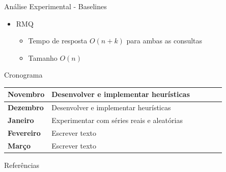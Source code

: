 \documentclass{beamer}
\begin{document}
\begin{frame}{Análise Experimental - Baselines}

\begin{itemize}
\item RMQ
\begin{itemize}
\item Tempo de resposta $O(n + k)$ para ambas as consultas
\item Tamanho $O(n)$
\end{itemize}
\end{itemize}

\end{frame}

\begin{frame}{Cronograma}
\begin{center}
\begin{tabular}{|l|l|l|l|l|l|}
\hline
\textbf{Novembro} & Desenvolver e implementar heurísticas \\
\hline
\textbf{Dezembro} & Desenvolver e implementar heurísticas \\
\hline
\textbf{Janeiro} & Experimentar com séries reais e aleatórias \\
\hline
\textbf{Fevereiro} & Escrever texto \\
\hline
\textbf{Março} & Escrever texto \\
\hline
\end{tabular}
\end{center}
\end{frame}

\begin{frame}{Referências}


\end{frame}
\end{document}
